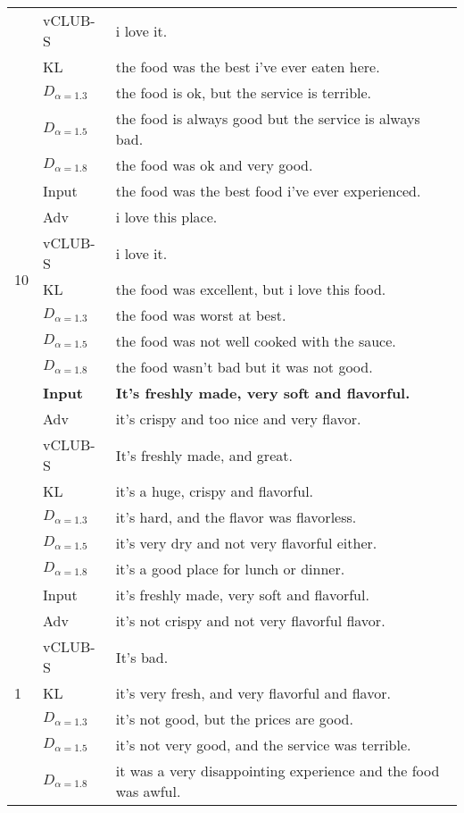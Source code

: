 \begin{table}
{\begin{tabular}{ll|l}
&vCLUB-S  & i love it. \\
&KL  &   the food was the best i've ever eaten here.\\
&$D_{\alpha=1.3}$  &  the food is ok, but the service is terrible. \\
&$D_{\alpha=1.5}$  &  	the food is always good but the service is always bad. \\
&$D_{\alpha=1.8}$  &  the food was ok and very good. \\\hline
\multirow{7}{*}{10} &Input  & the food was the best food i've ever experienced.  \\\hline
&Adv  & i love this place.  \\
&vCLUB-S  & i love it. \\
&KL  &  the food was excellent, but i love this food. \\
&$D_{\alpha=1.3}$  & the food was worst at best.  \\
&$D_{\alpha=1.5}$  & the food was not well cooked with the sauce.  \\
&$D_{\alpha=1.8}$  & 	the food wasn't bad but it was not good.  \\\hline\hline
\fi \multirow{7}{*}{0.1} &\textbf{Input}  &  	\textbf{It's freshly made, very soft and flavorful.} \\\hline
&Adv  & it's crispy and too nice and very flavor.  \\
&vCLUB-S  & It's freshly made, and great. \\
&KL  & it's a huge, crispy and flavorful.  \\
&$D_{\alpha=1.3}$  &  it's hard, and the flavor was flavorless. \\
&$D_{\alpha=1.5}$  & it's very dry and not very flavorful either.  \\
&$D_{\alpha=1.8}$  & it's a good place for lunch or dinner.  \\ \hline
\multirow{7}{*}{1} &Input  & 	it's freshly made, very soft and flavorful.  \\\hline
&Adv  &  it's not crispy and not very flavorful flavor. \\
&vCLUB-S  & It's bad. \\
&KL  & 	it's very fresh, and very flavorful and flavor.  \\
&$D_{\alpha=1.3}$  & it's not good, but the prices are good.  \\
&$D_{\alpha=1.5}$  &  it's not very good, and the service was terrible. \\
&$D_{\alpha=1.8}$ &	it was a very disappointing experience and the food was awful.   \\\hline

\end{tabular}}
\end{table}
